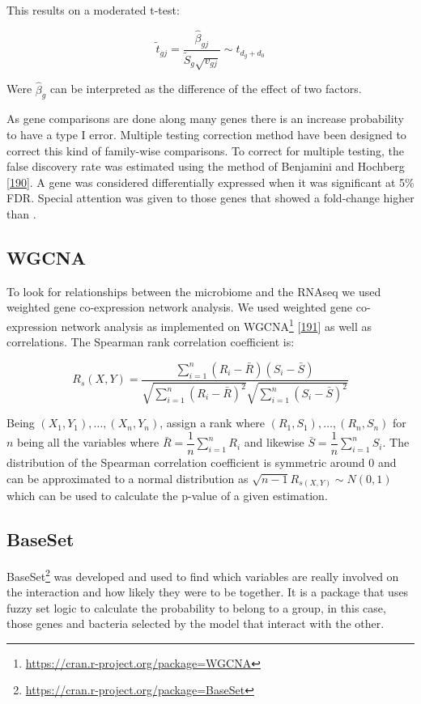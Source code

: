\documentclass[
  12pt,
  a4paper,
  twoside,
  openright]{book}
\DeclareRobustCommand{\href}[2]{#2\footnote{\url{#1}}}
\begin{document}
This results on a moderated t-test:

\[
\widetilde t_{gj} = \dfrac{\hat \beta_{gj}}{\tilde S_g \sqrt{v_{gj}}} \sim t_{d_g + d_0}
\]

Were \(\hat \beta_g\) can be interpreted as the difference of the effect of two factors.

As gene comparisons are done along many genes there is an increase probability to have a type I error.
Multiple testing correction method have been designed to correct this kind of family-wise comparisons.
To correct for multiple testing, the false discovery rate was estimated using the method of Benjamini and Hochberg {[}\protect\hyperlink{ref-yoavbenjamini}{190}{]}.
A gene was considered differentially expressed when it was significant at 5\% FDR.
Special attention was given to those genes that showed a fold-change higher than \textbar.

\hypertarget{wgcna}{%
\subsection{WGCNA}\label{wgcna}}

To look for relationships between the microbiome and the RNAseq we used weighted gene co-expression network analysis.
We used weighted gene co-expression network analysis as implemented on \href{https://cran.r-project.org/package=WGCNA}{WGCNA} {[}\protect\hyperlink{ref-langfelder2008}{191}{]} as well as correlations.
The Spearman rank correlation coefficient is:

\[
R_s(X,Y) = \dfrac{\sum_{i=1}^n (R_i - \bar{R}) (S_i - \bar{S} )}{\sqrt{\sum_{i=1}^n (R_i - \bar{R})^2}\sqrt{\sum_{i=1}^n (S_i - \bar{S})^2}}
\]

Being \((X_1 , Y_1 ),\dots, (X_n , Y_n)\), assign a rank where \((R_1 , S_1 ), \dots , (R_n , S_n )\) for \(n\) being all the variables where \(\bar{R}=\dfrac{1}{n}\sum_{i=1}^n R_i\) and likewise \(\bar{S}=\dfrac{1}{n}\sum_{i=1}^n S_i\).
The distribution of the Spearman correlation coefficient is symmetric around 0 and can be approximated to a normal distribution as \(\sqrt{n-1}R_{s(X,Y)} \sim N(0,1)\) which can be used to calculate the p-value of a given estimation.

\hypertarget{baseset}{%
\subsection{BaseSet}\label{baseset}}

\href{https://cran.r-project.org/package=BaseSet}{BaseSet} was developed and used to find which variables are really involved on the interaction and how likely they were to be together.
It is a package that uses fuzzy set logic to calculate the probability to belong to a group, in this case, those genes and bacteria selected by the model that interact with the other.
\end{document}
